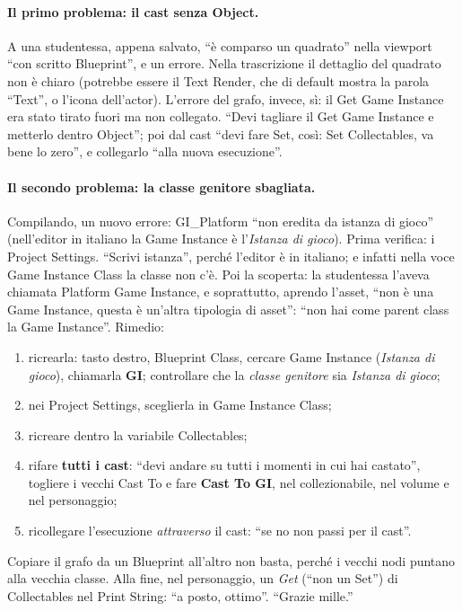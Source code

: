 \paragraph{Il primo problema: il cast senza Object.} A una studentessa, appena salvato,
``è comparso un quadrato'' nella viewport ``con scritto Blueprint'', e un errore. Nella
trascrizione il dettaglio del quadrato non è chiaro (potrebbe essere il Text Render, che
di default mostra la parola ``Text'', o l'icona dell'actor). L'errore del grafo, invece,
sì: il Get Game Instance era stato tirato fuori ma non collegato. ``Devi tagliare il Get
Game Instance e metterlo dentro Object''; poi dal cast ``devi fare Set, così: Set
Collectables, va bene lo zero'', e collegarlo ``alla nuova esecuzione''.

\paragraph{Il secondo problema: la classe genitore sbagliata.} Compilando, un nuovo
errore: GI\_Platform ``non eredita da istanza di gioco'' (nell'editor in italiano la Game
Instance è l'\emph{Istanza di gioco}). Prima verifica: i Project Settings. ``Scrivi
istanza'', perché l'editor è in italiano; e infatti nella voce Game Instance Class la
classe non c'è. Poi la scoperta: la studentessa l'aveva chiamata Platform Game Instance,
e soprattutto, aprendo l'asset, ``non è una Game Instance, questa è un'altra tipologia di
asset'': ``non hai come parent class la Game Instance''. Rimedio:
\begin{enumerate}
  \item ricrearla: tasto destro, Blueprint Class, cercare Game Instance
        (\emph{Istanza di gioco}), chiamarla \textbf{GI}; controllare che la
        \emph{classe genitore} sia \emph{Istanza di gioco};
  \item nei Project Settings, sceglierla in Game Instance Class;
  \item ricreare dentro la variabile Collectables;
  \item rifare \textbf{tutti i cast}: ``devi andare su tutti i momenti in cui hai
        castato'', togliere i vecchi Cast To e fare \textbf{Cast To GI}, nel
        collezionabile, nel volume e nel personaggio;
  \item ricollegare l'esecuzione \emph{attraverso} il cast: ``se no non passi per il
        cast''.
\end{enumerate}
Copiare il grafo da un Blueprint all'altro non basta, perché i vecchi nodi puntano alla
vecchia classe. Alla fine, nel personaggio, un \emph{Get} (``non un Set'') di
Collectables nel Print String: ``a posto, ottimo''. ``Grazie mille.''

